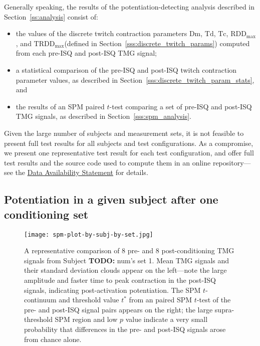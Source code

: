 \documentclass[utf8]{FrontiersinHarvard}
\newcommand{\TODO}[1]{{\textbf{TODO:} {\color{red} #1}}}
\newcommand{\Dm}{\ensuremath{\text{Dm}}\xspace}
\newcommand{\Td}{\ensuremath{\text{Td}}\xspace}
\newcommand{\Tc}{\ensuremath{\text{Tc}}\xspace}
\newcommand{\RDDMax}{\ensuremath{ \text{RDD}_{\text{max}}}\xspace}
\newcommand{\RDDMaxTime}{\ensuremath{ \text{TRDD}_{\text{max}}}\xspace}
\begin{document}
Generally speaking, the results of the potentiation-detecting analysis described in Section~\ref{ss:analysis} consist of:
\begin{itemize}

    \item the values of the discrete twitch contraction parameters \Dm, \Td, \Tc, \RDDMax, and \RDDMaxTime (defined in Section~\ref{sss:discrete_twitch_params}) computed from each pre-ISQ and post-ISQ TMG signal;

    \item a statistical comparison of the pre-ISQ and post-ISQ twitch contraction parameter values, as described in Section~\ref{sss:discrete_twitch_param_stats}, and

    \item the results of an SPM paired $ t $-test comparing a set of pre-ISQ and post-ISQ TMG signals, as described in Section~\ref{sss:spm_analysis}.

\end{itemize}
Given the large number of subjects and measurement sets, it is not feasible to present full test results for all subjects and test configurations.
As a compromise, we present one representative test result for each test configuration, and offer full test results and the source code used to compute them in an online repository---see the \hyperref[s:data_availability]{Data Availability Statement} for details.


\subsection{Potentiation in a given subject after one conditioning set}

\begin{figure}
	\centering
    \texttt{[image: spm-plot-by-subj-by-set.jpg]}
    \caption{A representative comparison of 8 pre- and 8 post-conditioning TMG signals from Subject \TODO{num}'s set 1.
    Mean TMG signals and their standard deviation clouds appear on the left---note the large amplitude and faster time to peak contraction in the post-ISQ signals, indicating post-activation potentiation.
    The SPM $ t $-continuum and threshold value $ t^{*} $ from an paired SPM $ t $-test of the pre- and post-ISQ signal pairs appears on the right;
    the large supra-threshold SPM region and low $ p $ value indicate a very small probability that differences in the pre- and post-ISQ signals arose from chance alone.}
    \label{fig:spm_example_result_by_subj_by_set}
\end{figure}
\end{document}
